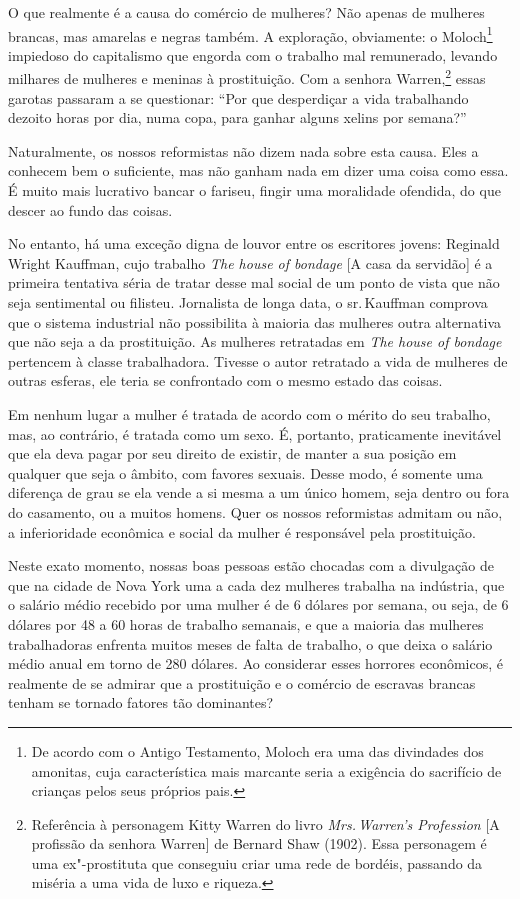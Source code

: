 O que realmente é a causa do comércio de mulheres? Não apenas de
mulheres brancas, mas amarelas e negras também. A exploração,
obviamente: o Moloch\footnote{De acordo com o Antigo Testamento, 
Moloch era uma das divindades dos amonitas, cuja característica mais marcante seria a exigência do sacrifício de crianças pelos seus próprios pais.} impiedoso do capitalismo que engorda com o trabalho
mal remunerado, levando milhares de mulheres e meninas à prostituição.
Com a senhora Warren,\footnote{Referência à personagem Kitty Warren do
  livro \emph{Mrs.\,Warren's Profession} {[}A profissão da senhora Warren{]} de Bernard Shaw (1902). Essa personagem é uma
  ex"-prostituta que conseguiu criar uma rede de bordéis, passando da
  miséria a uma vida de luxo e riqueza.} essas garotas passaram a se
questionar: ``Por que desperdiçar a vida trabalhando dezoito horas por
dia, numa copa, para ganhar alguns xelins por semana?''

Naturalmente, os nossos reformistas não dizem nada sobre esta causa.
Eles a conhecem bem o suficiente, mas não ganham nada em dizer uma coisa
como essa. É muito mais lucrativo bancar o fariseu, fingir uma
moralidade ofendida, do que descer ao fundo das coisas.

No entanto, há uma exceção digna de louvor entre os escritores jovens:
Reginald Wright Kauffman, cujo trabalho \emph{The house of bondage}
{[}A casa da servidão{]} é a primeira tentativa séria de tratar
desse mal social de um ponto de vista que não seja sentimental ou
filisteu. Jornalista de longa data, o sr.\,Kauffman comprova que o
sistema industrial não possibilita à maioria das mulheres outra
alternativa que não seja a da prostituição. As mulheres retratadas em
\emph{The house of bondage} pertencem à classe trabalhadora. Tivesse o
autor retratado a vida de mulheres de outras esferas, ele teria se
confrontado com o mesmo estado das coisas.

Em nenhum lugar a mulher é tratada de acordo com o mérito do seu
trabalho, mas, ao contrário, é tratada como um sexo. É, portanto,
praticamente inevitável que ela deva pagar por seu direito de existir,
de manter a sua posição em qualquer que seja o âmbito, com favores
sexuais. Desse modo, é somente uma diferença de grau se ela vende a si
mesma a um único homem, seja dentro ou fora do casamento, ou a muitos
homens. Quer os nossos reformistas admitam ou não, a inferioridade
econômica e social da mulher é responsável pela prostituição.

Neste exato momento, nossas boas pessoas estão chocadas com a divulgação
de que na cidade de Nova York uma a cada dez mulheres trabalha na
indústria, que o salário médio recebido por uma mulher é de 6 dólares por
semana, ou seja, de 6 dólares por 48 a 60 horas de trabalho semanais, e que a
maioria das mulheres trabalhadoras enfrenta muitos meses de falta de
trabalho, o que deixa o salário médio anual em torno de 280 dólares. Ao
considerar esses horrores econômicos, é realmente de se admirar que a
prostituição e o comércio de escravas brancas tenham se tornado fatores
tão dominantes?

